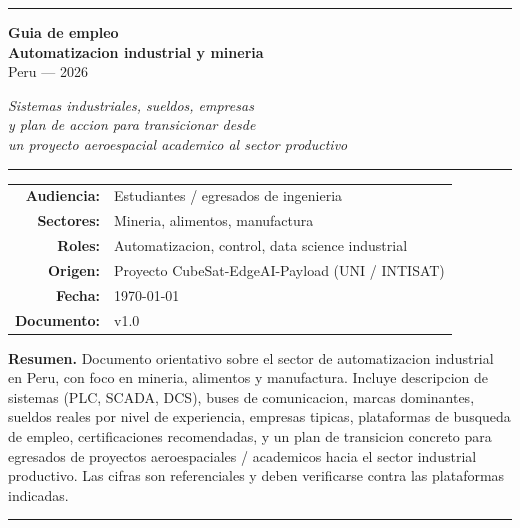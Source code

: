 \documentclass[11pt,a4paper,oneside]{report}
\begin{document}
\begin{titlepage}
\centering
\vspace*{1cm}
{\color{intisat}\rule{\textwidth}{2pt}}
\vspace{0.6cm}

{\Huge\bfseries\color{intisat} Guia de empleo}\\[0.3em]
{\LARGE\bfseries Automatizacion industrial y mineria}\\[0.3em]
{\Large Peru — 2026}

\vspace{0.7cm}
{\Large\itshape Sistemas industriales, sueldos, empresas\\
y plan de accion para transicionar desde\\
un proyecto aeroespacial academico al sector productivo}

\vspace{1cm}
{\color{intisataccent}\rule{0.6\textwidth}{1pt}}

\vspace{2cm}

\begin{tabular}{rl}
\textbf{Audiencia:} & Estudiantes / egresados de ingenieria \\
\textbf{Sectores:} & Mineria, alimentos, manufactura \\
\textbf{Roles:} & Automatizacion, control, data science industrial \\
\textbf{Origen:} & Proyecto CubeSat-EdgeAI-Payload (UNI / INTISAT) \\
\textbf{Fecha:} & \today \\
\textbf{Documento:} & v1.0
\end{tabular}

\vfill

\begin{minipage}{0.85\textwidth}
\textbf{Resumen.}\quad
Documento orientativo sobre el sector de automatizacion industrial en
Peru, con foco en mineria, alimentos y manufactura. Incluye descripcion
de sistemas (PLC, SCADA, DCS), buses de comunicacion, marcas dominantes,
sueldos reales por nivel de experiencia, empresas tipicas, plataformas
de busqueda de empleo, certificaciones recomendadas, y un plan de
transicion concreto para egresados de proyectos aeroespaciales /
academicos hacia el sector industrial productivo. Las cifras son
referenciales y deben verificarse contra las plataformas indicadas.
\end{minipage}

\vspace{1.2cm}
{\color{intisat}\rule{\textwidth}{2pt}}
\end{titlepage}
\end{document}
